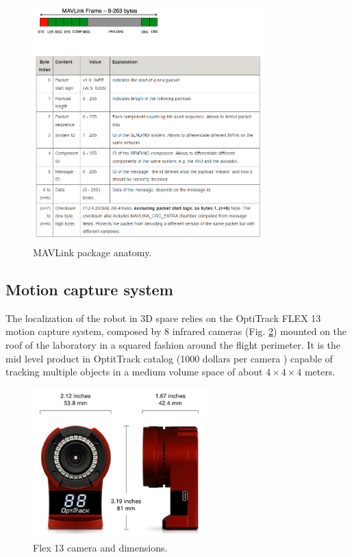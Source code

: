 \begin{figure}[h]
 \centering
 \includegraphics[width=0.8\textwidth]{MAVPack.PNG}
 \caption[MAVLink package anatomy]{MAVLink package anatomy.}
 \label{figure:MAV_anatomy}
\end{figure}

\newpage
\subsection{Motion capture system}
\label{sec:mocap}
The localization of the robot in 3D space relies on the OptiTrack FLEX 13 motion capture system, composed by 8 infrared cameras (Fig. \ref{figure:flex13}) mounted on the roof of the laboratory in a squared fashion around the flight perimeter. It is the mid level product in OptitTrack catalog (1000 dollars per camera \cite{OptiT}) capable of tracking multiple objects in a medium volume space of about $4 \times 4 \times 4$ meters.

\begin{figure}[h]
 \centering
 \includegraphics[width=0.6\textwidth]{flex13.PNG}
 \caption[Flex 13 Cameras]{Flex 13 camera and dimensions.}
 \label{figure:flex13}
\end{figure}


